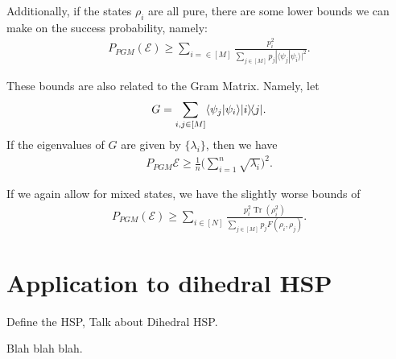 \documentclass{amsart}
\theoremstyle{plain}
\theoremstyle{remark}
\newcommand{\bra}[1]{\langle{#1}|}
\newcommand{\ket}[1]{|{#1}\rangle}
\newcommand{\braket}[2]{\langle{#1}|{#2}\rangle}
\newcommand{\ketbra}[2]{\ket{#1}\hspace{-1.5pt}\bra{#2}}
\DeclareMathOperator{\tr}{Tr}
\begin{document}
Additionally, if the states $\rho_i$ are all pure, there are some lower bounds we can make on the success probability, namely:
\begin{align}
  P_{PGM}(\mathcal{E})  \geq \sum_{i=\in[M]} \frac{ p_i^2}{\sum_{j\in[M]} p_j |\braket{\psi_j}{\psi_i}|^2}.
\end{align}

These bounds are also related to the Gram Matrix.  Namely, let
\begin{align}
  G = \sum_{i,j\in [M]} \braket{\psi_j}{\psi_i} \ketbra{i}{j}.
\end{align}
If the eigenvalues of $G$ are given by $\{\lambda_i\}$, then we have
\begin{align}
  P_{PGM}{\mathcal{E}} \geq \frac{1}{n} \Big( \sum_{i=1}^n \sqrt{\lambda_i}\Big)^2.
\end{align}

If we again allow for mixed states, we have the slightly worse bounds of
\begin{align}
  P_{PGM}(\mathcal{E}) \geq \sum_{i\in[N]} \frac{ p_i^2 \tr(\rho_i^2)}{\sum_{j\in [M]} p_j F(\rho_i,\rho_j)}.
\end{align}


\section{Application to dihedral HSP}

Define the HSP,
Talk about Dihedral HSP.

Blah blah blah.


\nocite{*}



\end{document}
